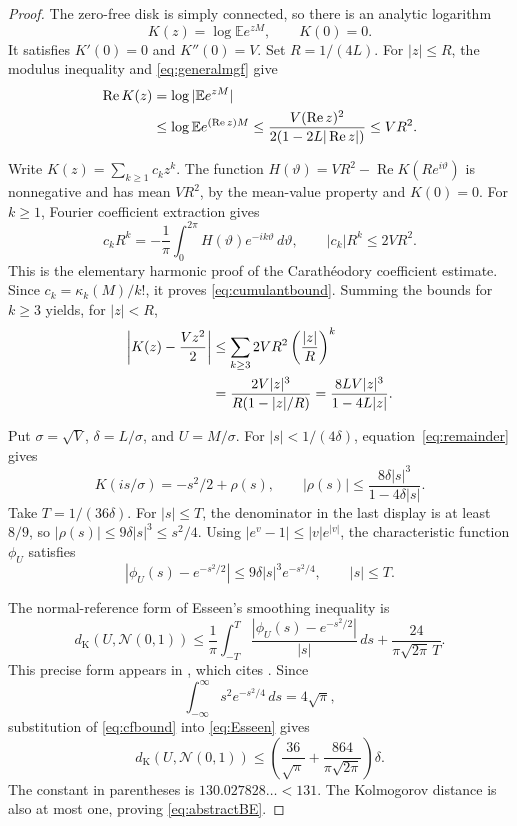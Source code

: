 \documentclass[11pt]{article}
\numberwithin{equation}{section}
\theoremstyle{remark}
\newcommand{\E}{\mathbb E}
\newcommand{\dK}{d_{\mathrm K}}
\newcommand{\Normal}{\mathcal N(0,1)}
\begin{document}
\begin{proof}
The zero-free disk is simply connected, so there is an analytic logarithm
\[
 K(z)=\log\E e^{zM},\qquad K(0)=0.
\]
It satisfies $K'(0)=0$ and $K''(0)=V$. Set $R=1/(4L)$. For $|z|\le R$,
the modulus inequality and \eqref{eq:generalmgf} give
\begin{align}
 \operatorname{Re}K(z)
 &=\log|\E e^{zM}|\notag\\
 &\le\log\E e^{(\operatorname{Re}z)M}
 \le\frac{V(\operatorname{Re}z)^2}{2(1-2L|\operatorname{Re}z|)}
 \le VR^2.
 \label{eq:realpartbound}
\end{align}

Write $K(z)=\sum_{k\ge1}c_kz^k$. The function
$H(\vartheta)=VR^2-\operatorname{Re}K(Re^{i\vartheta})$ is nonnegative
and has mean $VR^2$, by the mean-value property and $K(0)=0$. For $k\ge1$,
Fourier coefficient extraction gives
\[
 c_kR^k=-\frac1\pi\int_0^{2\pi}
                      H(\vartheta)e^{-ik\vartheta}\,d\vartheta,
 \qquad |c_k|R^k\le2VR^2.
\]
This is the elementary harmonic proof of the Carath\'eodory coefficient
estimate. Since $c_k=\kappa_k(M)/k!$, it proves
\eqref{eq:cumulantbound}. Summing the bounds for $k\ge3$ yields, for
$|z|<R$,
\begin{align}
 \left|K(z)-\frac{Vz^2}{2}\right|
 &\le\sum_{k\ge3}2VR^2\left(\frac{|z|}{R}\right)^k\notag\\
 &=\frac{2V|z|^3}{R(1-|z|/R)}
 =\frac{8LV|z|^3}{1-4L|z|}.
 \label{eq:remainder}
\end{align}

Put $\sigma=\sqrt V$, $\delta=L/\sigma$, and $U=M/\sigma$. For
$|s|<1/(4\delta)$, equation~\eqref{eq:remainder} gives
\[
 K(is/\sigma)=-s^2/2+\rho(s),
 \qquad |\rho(s)|\le\frac{8\delta|s|^3}{1-4\delta|s|}.
\]
Take $T=1/(36\delta)$. For $|s|\le T$, the denominator in the last
display is at least $8/9$, so $|\rho(s)|\le9\delta|s|^3\le s^2/4$.
Using $|e^v-1|\le|v|e^{|v|}$, the characteristic function $\phi_U$ satisfies
\begin{equation}\label{eq:cfbound}
 |\phi_U(s)-e^{-s^2/2}|
 \le9\delta|s|^3e^{-s^2/4},\qquad |s|\le T.
\end{equation}

The normal-reference form of Esseen's smoothing inequality is
\begin{equation}\label{eq:Esseen}
 \dK(U,\Normal)
 \le\frac1\pi\int_{-T}^{T}
       \frac{|\phi_U(s)-e^{-s^2/2}|}{|s|}\,ds
       +\frac{24}{\pi\sqrt{2\pi}\,T}.
\end{equation}
This precise form appears in \cite[equation~(2.16)]{LPRS}, which cites
\cite[Section~XVI.4, Lemma~2]{Feller}. Since
\[
 \int_{-\infty}^{\infty}s^2e^{-s^2/4}\,ds=4\sqrt\pi,
\]
substitution of \eqref{eq:cfbound} into \eqref{eq:Esseen} gives
\[
 \dK(U,\Normal)
 \le\left(\frac{36}{\sqrt\pi}
        +\frac{864}{\pi\sqrt{2\pi}}\right)\delta.
\]
The constant in parentheses is $130.027828\ldots<131$. The Kolmogorov
distance is also at most one, proving \eqref{eq:abstractBE}.
\end{proof}
\end{document}
